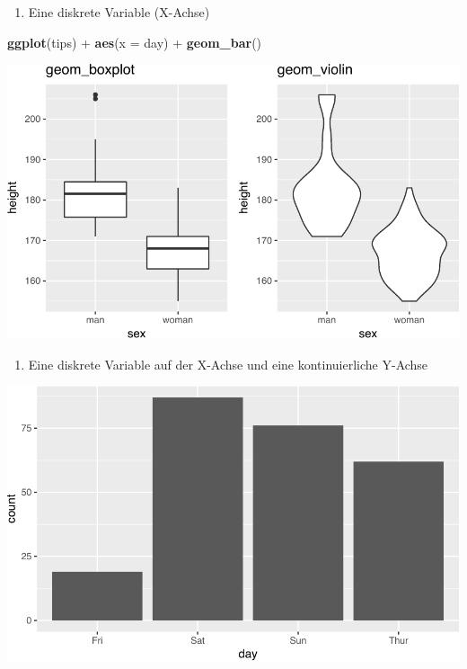 \documentclass[12pt,ngerman,]{book}
\newenvironment{Shaded}{\begin{snugshade}}{\end{snugshade}}
\newcommand{\KeywordTok}[1]{\textcolor[rgb]{0.13,0.29,0.53}{\textbf{{#1}}}}
\newcommand{\DataTypeTok}[1]{\textcolor[rgb]{0.13,0.29,0.53}{{#1}}}
\newcommand{\StringTok}[1]{\textcolor[rgb]{0.31,0.60,0.02}{{#1}}}
\newcommand{\NormalTok}[1]{{#1}}
\providecommand{\tightlist}{%
  \setlength{\itemsep}{0pt}\setlength{\parskip}{0pt}}
\renewenvironment{Shaded}{\begin{kframe}}{\end{kframe}}
\begin{document}
\begin{enumerate}
\def\labelenumi{\arabic{enumi}.}
\setcounter{enumi}{2}
\tightlist
\item
  Eine diskrete Variable (X-Achse)
\end{enumerate}

\begin{Shaded}
\begin{Highlighting}[]

\KeywordTok{ggplot}\NormalTok{(tips) +}
\StringTok{  }\KeywordTok{aes}\NormalTok{(}\DataTypeTok{x =} \NormalTok{day) +}
\StringTok{  }\KeywordTok{geom_bar}\NormalTok{()}
\end{Highlighting}
\end{Shaded}

\begin{center}\includegraphics[width=0.7\linewidth]{050_Daten_visualisieren_files/figure-latex/unnamed-chunk-36-1} \end{center}

\begin{enumerate}
\def\labelenumi{\arabic{enumi}.}
\setcounter{enumi}{3}
\tightlist
\item
  Eine diskrete Variable auf der X-Achse und eine kontinuierliche
  Y-Achse
\end{enumerate}

\begin{center}\includegraphics[width=0.7\linewidth]{050_Daten_visualisieren_files/figure-latex/unnamed-chunk-37-1} \end{center}
\end{document}
